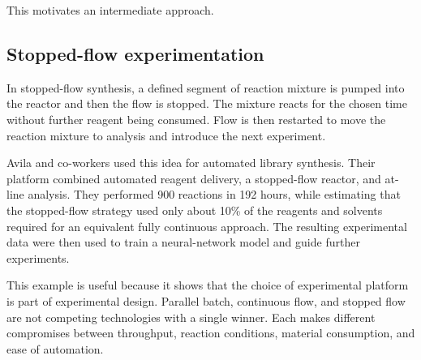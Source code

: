 This motivates an intermediate approach.

\subsection{Stopped-flow experimentation}

In stopped-flow synthesis, a defined segment of reaction mixture is pumped into the reactor and then the flow is stopped. The mixture reacts for the chosen time without further reagent being consumed. Flow is then restarted to move the reaction mixture to analysis and introduce the next experiment.


Avila and co-workers used this idea for automated library synthesis. Their platform combined automated reagent delivery, a stopped-flow reactor, and at-line analysis. They performed 900 reactions in 192 hours, while estimating that the stopped-flow strategy used only about 10\% of the reagents and solvents required for an equivalent fully continuous approach. The resulting experimental data were then used to train a neural-network model and guide further experiments.

This example is useful because it shows that the choice of experimental platform is part of experimental design. Parallel batch, continuous flow, and stopped flow are not competing technologies with a single winner. Each makes different compromises between throughput, reaction conditions, material consumption, and ease of automation.


